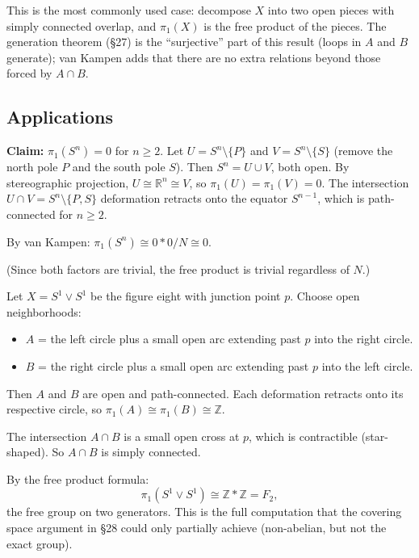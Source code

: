 \documentclass[11pt]{report}
\begin{document}
\begin{rembox}
This is the most commonly used case: decompose $X$ into two open pieces with simply connected overlap, and $\pi_1(X)$ is the free product of the pieces. The generation theorem (\S 27) is the ``surjective'' part of this result (loops in $A$ and $B$ generate); van Kampen adds that there are no extra relations beyond those forced by $A \cap B$.
\end{rembox}

\subsection{Applications}

\begin{exbox}
\textbf{Claim:} $\pi_1(S^n) = 0$ for $n \geq 2$.
Let $U = S^n \setminus \{P\}$ and $V = S^n \setminus \{S\}$ (remove the north pole $P$ and the south pole $S$). Then $S^n = U \cup V$, both open. By stereographic projection, $U \cong \mathbb{R}^n \cong V$, so $\pi_1(U) = \pi_1(V) = 0$. The intersection $U \cap V = S^n \setminus \{P, S\}$ deformation retracts onto the equator $S^{n-1}$, which is path-connected for $n \geq 2$.

By van Kampen: $\pi_1(S^n) \cong 0 * 0 / N \cong 0$.

(Since both factors are trivial, the free product is trivial regardless of $N$.)
\end{exbox}

\begin{exbox}
Let $X = S^1 \vee S^1$ be the figure eight with junction point $p$. Choose open neighborhoods:
\begin{itemize}[nosep]
    \item $A$ = the left circle plus a small open arc extending past $p$ into the right circle.
    \item $B$ = the right circle plus a small open arc extending past $p$ into the left circle.
\end{itemize}
Then $A$ and $B$ are open and path-connected. Each deformation retracts onto its respective circle, so $\pi_1(A) \cong \pi_1(B) \cong \mathbb{Z}$.

The intersection $A \cap B$ is a small open cross at $p$, which is contractible (star-shaped). So $A \cap B$ is simply connected.

By the free product formula:
\[\pi_1(S^1 \vee S^1) \cong \mathbb{Z} * \mathbb{Z} = F_2,\]
the free group on two generators. This is the full computation that the covering space argument in \S 28 could only partially achieve (non-abelian, but not the exact group).
\end{exbox}
\end{document}
